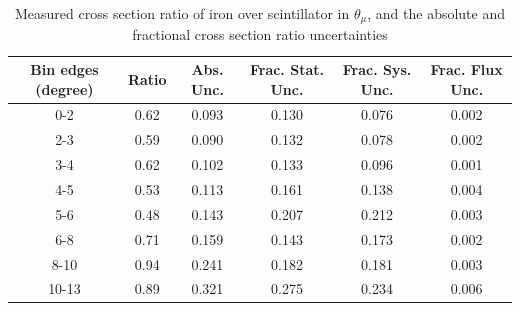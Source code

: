 \documentclass[../main.tex]{subfiles}
\begin{document}
\begin{table}
  \centering
  \renewcommand{\arraystretch}{1.15}
  \caption{Systematic covariance matrix of measured cross section ratio of iron over scintillator in $p_{\mu}$}
  \label{tbl:rationucleonnuc26muon_pc}
\end{table}
\begin{table}
  \centering
  \renewcommand{\arraystretch}{1.15}
  \caption{Measured cross section ratio of iron over scintillator in $\theta_{\mu}$, and the absolute and fractional cross section ratio uncertainties}
    \begin{tabular}{c||c|c||c|c|c}
      Bin edges (degree) &  Ratio  &  Abs. Unc.  &  Frac. Stat. Unc.  &  Frac. Sys. Unc.  &  Frac. Flux Unc. \\
      \hline
      \hline
      0-2 & 0.62 & 0.093 & 0.130 & 0.076 & 0.002\\
      2-3 & 0.59 & 0.090 & 0.132 & 0.078 & 0.002\\
      3-4 & 0.62 & 0.102 & 0.133 & 0.096 & 0.001\\
      4-5 & 0.53 & 0.113 & 0.161 & 0.138 & 0.004\\
      5-6 & 0.48 & 0.143 & 0.207 & 0.212 & 0.003\\
      6-8 & 0.71 & 0.159 & 0.143 & 0.173 & 0.002\\
      8-10 & 0.94 & 0.241 & 0.182 & 0.181 & 0.003\\
      10-13 & 0.89 & 0.321 & 0.275 & 0.234 & 0.006
    \end{tabular}
  \label{tbl:rationucleonnuc26muon_thetaa}
\end{table}
\end{document}
